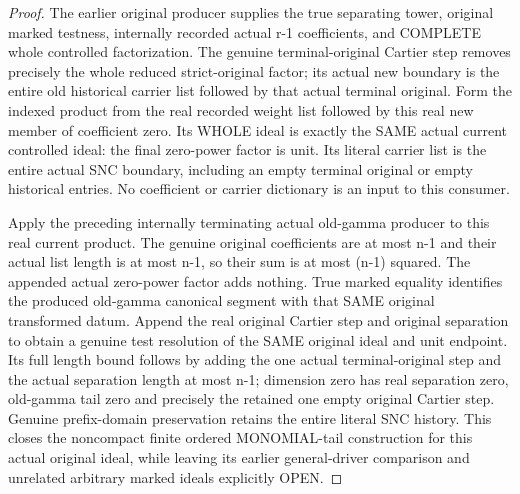 \begin{proof}
The earlier original producer supplies the true separating tower, original
marked testness, internally recorded actual r-1 coefficients, and COMPLETE
whole controlled factorization. The genuine terminal-original Cartier step
removes precisely the whole reduced strict-original factor; its actual new
boundary is the entire old historical carrier list followed by that actual
terminal original. Form the indexed product from the real recorded weight
list followed by this real new member of coefficient zero. Its WHOLE ideal
is exactly the SAME actual current controlled ideal: the final zero-power
factor is unit. Its literal carrier list is the entire actual SNC boundary,
including an empty terminal original or empty historical entries. No
coefficient or carrier dictionary is an input to this consumer.

Apply the preceding internally terminating actual old-gamma producer to
this real current product. The genuine original coefficients are at most
n-1 and their actual list length is at most n-1, so their sum is at most
(n-1) squared. The appended actual zero-power factor adds nothing. True
marked equality identifies the produced old-gamma canonical segment with
that SAME original transformed datum. Append the real original Cartier
step and original separation to obtain a genuine test resolution of the
SAME original ideal and unit endpoint. Its full length bound follows by
adding the one actual terminal-original step and the actual separation
length at most n-1; dimension zero has real separation zero, old-gamma tail
zero and precisely the retained one empty original Cartier step. Genuine
prefix-domain preservation retains the entire literal SNC history. This
closes the noncompact finite ordered MONOMIAL-tail construction for this
actual original ideal, while leaving its earlier general-driver comparison
and unrelated arbitrary marked ideals explicitly OPEN.
\end{proof}
